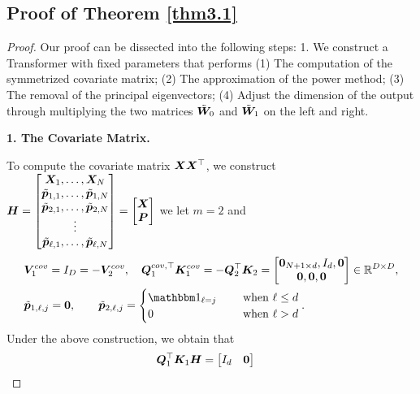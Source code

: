 \subsection{Proof of Theorem \ref{thm3.1}}
\begin{proof}
    Our proof can be dissected into the following steps: 1. We construct a Transformer with fixed parameters that performs
    (1) The computation of the symmetrized covariate matrix; (2) The approximation of the power method; (3) The removal of the principal eigenvectors; (4) Adjust the dimension of the output through multiplying the two matrices $\tilde{\boldsymbol{W}}_0$ and $\tilde{\boldsymbol{W}}_1$ on the left and right.
    \begin{center}
        \textbf{1. The Covariate Matrix.}
    \end{center}
    To compute the covariate matrix $\boldsymbol{X}\boldsymbol{X}^\top$, we construct $\boldsymbol{H}=\begin{bmatrix}
        \boldsymbol{X}_1,\ldots,\boldsymbol{X}_N\\
        \tilde{\boldsymbol{p}}_{1,1},\ldots,\tilde{\boldsymbol{p}}_{1,N}\\
        \tilde{\boldsymbol{p}}_{2,1},\ldots,\tilde{\boldsymbol{p}}_{2,N}\\
        \vdots\\
        \tilde{\boldsymbol{p}}_{\ell,1},\ldots,\tilde{\boldsymbol{p}}_{\ell,N}
    \end{bmatrix}=\begin{bmatrix}
        \boldsymbol{X}\\
        \boldsymbol{P}
    \end{bmatrix}$
    we let $m=2$ and
    \begin{align}
     & \bfa V_1^{cov}=I_D=-\bfa V_2^{cov},\quad \bfa Q_1^{cov,\top}\bfa K_1^{cov}=-\bfa Q_2^\top\bfa K_2=\begin{bmatrix}
         \bfa 0_{N+1\times d}, I_d,\bfa 0\\
         \bfa 0,\bfa 0,\bfa 0
     \end{bmatrix}\in\bb R^{D\times D},\nnb\\
     &\tda p_{1,\ell,j}=\bfa 0,\qquad\tda p_{2,\ell,j}=\begin{cases}
         \mbbm 1_{\ell=j}\quad&\text{ when }\ell\leq d\\
         0&\text{ when }\ell>d
     \end{cases}.
    \end{align}
    Under the above construction, we obtain that
    \begin{align*}
        &\boldsymbol{Q}_1^\top\boldsymbol{K}_1\boldsymbol{H}=\begin{bmatrix}
            I_{d}&\boldsymbol{0}\\

\end{bmatrix}
\end{align*}
\end{proof}

